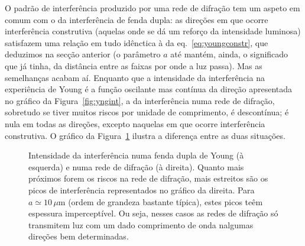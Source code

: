 O padrão de interferência produzido por uma rede de difração tem um aspeto em
comum com o da interferência de fenda dupla: as direções em que ocorre
interferência construtiva (aquelas onde se dá um reforço da intensidade
luminosa) satisfazem uma relação em tudo idênctica à da
eq.~\eqref{eq:youngconstr}, que deduzimos na secção anterior (o parâmetro $a$
até mantém, ainda, o significado que já tinha, da distância entre as faixas por
onde a luz passa). Mas as semelhanças acabam aí. Enquanto que a intensidade da
interferência na experiência de Young é a função oscilante mas contínua da
direção apresentada no gráfico da Figura~\ref{fig:yngint}, a da interferência
numa rede de difração, sobretudo se tiver muitos riscos por unidade de
comprimento, é descontínua; é nula em todas as direções, excepto naquelas em que
ocorre interferência construtiva. O gráfico da Figura~\ref{fig:gratingi} ilustra
a diferença entre as duas situações.
\begin{figure}[htb]
{\centering
  \par
}
\caption{\label{fig:gratingi}Intensidade da interferência numa fenda dupla de
Young (à esquerda) e numa rede de difração (à direita). Quanto mais próximos
forem os riscos na rede de difração, mais estreitos são os picos de
interferência representados no gráfico da direita. Para $a\simeq 10\,\mu$m
(ordem de grandeza bastante típica), estes picos teêm espessura imperceptível.
Ou seja, nesses casos as redes de difração só transmitem luz com um dado
comprimento de onda nalgumas direções bem determinadas.}
\end{figure}


